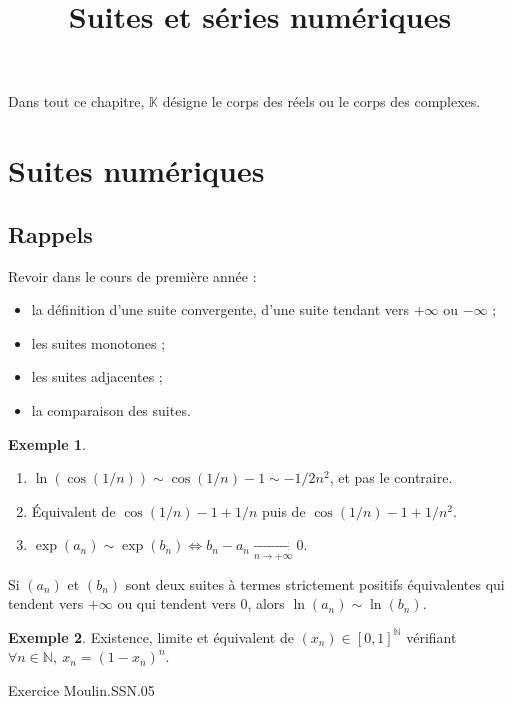 \documentclass[french]{article}
\title{Suites et séries numériques}
\date{}
\newcommand{\N}{\mathbb{N}}
\newcommand{\K}{\mathbb{K}}
\theoremstyle{plain}
\theoremstyle{definition}
\newtheorem*{ex}{Exemple}
\theoremstyle{remark}
\begin{document}
\tableofcontents
\newpage

\maketitle

Dans tout ce chapitre, $\K$ désigne le corps des réels ou le corps des complexes.

\section{Suites numériques}

\subsection{Rappels}

Revoir dans le cours de première année :
\begin{itemize}
	\item la définition d'une suite convergente, d'une suite tendant vers $+\infty$ ou $-\infty$ ;
	\item les suites monotones ;
	\item les suites adjacentes ;
	\item la comparaison des suites.
\end{itemize}

\begin{ex}
	\begin{enumerate}
		\item $\ln(\cos(1/n))\sim\cos(1/n)-1\sim-1/2n^2$, et pas le contraire.
		\item Équivalent de $\cos(1/n)-1+1/n$ puis de $\cos(1/n)-1+1/n^2$.
		\item $\exp(a_n)\sim\exp(b_n)\iff b_n-a_n\xrightarrow[n\to+\infty]{}0$.
	\end{enumerate}
\end{ex}

\begin{prop}[HP]%
	Si $(a_n)$ et $(b_n)$ sont deux suites à termes strictement positifs équivalentes qui tendent vers $+\infty$ ou qui tendent vers $0$, alors $\ln(a_n)\sim\ln(b_n)$.
\end{prop}

\begin{ex}
	Existence, limite et équivalent de $(x_n)\in[0,1]^\N$ vérifiant $\forall n\in\N,\ x_n=(1-x_n)^n$.
\end{ex}

Exercice Moulin.SSN.05
\end{document}
